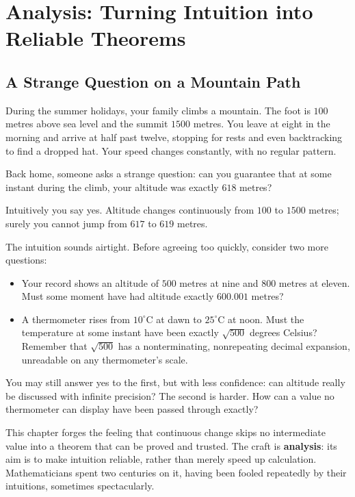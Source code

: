 \chapter{Analysis: Turning Intuition into Reliable Theorems}

\section{A Strange Question on a Mountain Path}

During the summer holidays, your family climbs a mountain. The foot is $100$ metres above sea level and the summit $1500$ metres. You leave at eight in the morning and arrive at half past twelve, stopping for rests and even backtracking to find a dropped hat. Your speed changes constantly, with no regular pattern.

Back home, someone asks a strange question: can you guarantee that at some instant during the climb, your altitude was exactly $618$ metres?

Intuitively you say yes. Altitude changes continuously from $100$ to $1500$ metres; surely you cannot jump from $617$ to $619$ metres.

The intuition sounds airtight. Before agreeing too quickly, consider two more questions:

\begin{itemize}
  \item Your record shows an altitude of $500$ metres at nine and $800$ metres at eleven. Must some moment have had altitude exactly $600.001$ metres?
  \item A thermometer rises from $10^\circ$C at dawn to $25^\circ$C at noon. Must the temperature at some instant have been exactly $\sqrt{500}$ degrees Celsius? Remember that $\sqrt{500}$ has a nonterminating, nonrepeating decimal expansion, unreadable on any thermometer's scale.
\end{itemize}

You may still answer yes to the first, but with less confidence: can altitude really be discussed with infinite precision? The second is harder. How can a value no thermometer can display have been passed through exactly?

This chapter forges the feeling that continuous change skips no intermediate value into a theorem that can be proved and trusted. The craft is \textbf{analysis}: its aim is to make intuition reliable, rather than merely speed up calculation. Mathematicians spent two centuries on it, having been fooled repeatedly by their intuitions, sometimes spectacularly.

